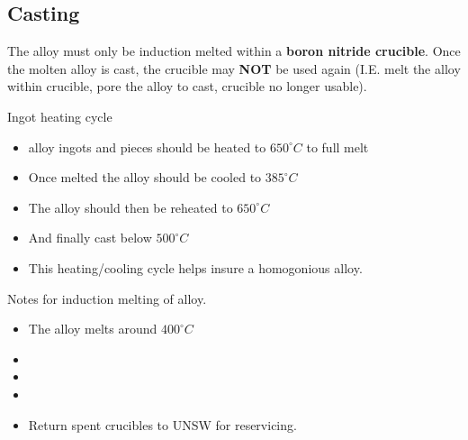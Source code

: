 \subsection{Casting}

The \MgZnCa alloy must only be induction melted within a \textbf{boron nitride crucible}. Once the molten alloy is cast, the crucible may \textbf{NOT} be used again (I.E. melt the alloy within crucible, pore the alloy to cast, crucible no longer usable). 

Ingot heating cycle
\begin{itemize}
\item \MgZnCa alloy ingots and pieces should be heated to $650^{\circ}C$ to full melt
\item Once melted the alloy should be cooled to $385^{\circ}C$
\item The alloy should then be reheated to $650^{\circ}C$
\item And finally cast below $500^{\circ}C$
\item This heating/cooling cycle helps insure a homogonious alloy.
\end{itemize}

Notes for induction melting of \MgZnCa alloy.
\begin{itemize}
\item The \MgZnCa alloy melts around $400^{\circ}C$
\item 
\item 
\item
\item Return spent crucibles to UNSW for reservicing. 
\end{itemize}